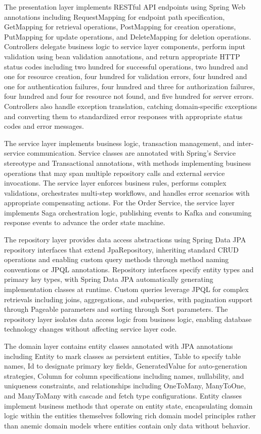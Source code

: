 The presentation layer implements RESTful API endpoints using Spring Web annotations including RequestMapping for endpoint path specification, GetMapping for retrieval operations, PostMapping for creation operations, PutMapping for update operations, and DeleteMapping for deletion operations. Controllers delegate business logic to service layer components, perform input validation using bean validation annotations, and return appropriate HTTP status codes including two hundred for successful operations, two hundred and one for resource creation, four hundred for validation errors, four hundred and one for authentication failures, four hundred and three for authorization failures, four hundred and four for resource not found, and five hundred for server errors. Controllers also handle exception translation, catching domain-specific exceptions and converting them to standardized error responses with appropriate status codes and error messages.

The service layer implements business logic, transaction management, and inter-service communication. Service classes are annotated with Spring's Service stereotype and Transactional annotations, with methods implementing business operations that may span multiple repository calls and external service invocations. The service layer enforces business rules, performs complex validations, orchestrates multi-step workflows, and handles error scenarios with appropriate compensating actions. For the Order Service, the service layer implements Saga orchestration logic, publishing events to Kafka and consuming response events to advance the order state machine.

The repository layer provides data access abstractions using Spring Data JPA repository interfaces that extend JpaRepository, inheriting standard CRUD operations and enabling custom query methods through method naming conventions or JPQL annotations. Repository interfaces specify entity types and primary key types, with Spring Data JPA automatically generating implementation classes at runtime. Custom queries leverage JPQL for complex retrievals including joins, aggregations, and subqueries, with pagination support through Pageable parameters and sorting through Sort parameters. The repository layer isolates data access logic from business logic, enabling database technology changes without affecting service layer code.

The domain layer contains entity classes annotated with JPA annotations including Entity to mark classes as persistent entities, Table to specify table names, Id to designate primary key fields, GeneratedValue for auto-generation strategies, Column for column specifications including names, nullability, and uniqueness constraints, and relationships including OneToMany, ManyToOne, and ManyToMany with cascade and fetch type configurations. Entity classes implement business methods that operate on entity state, encapsulating domain logic within the entities themselves following rich domain model principles rather than anemic domain models where entities contain only data without behavior.

